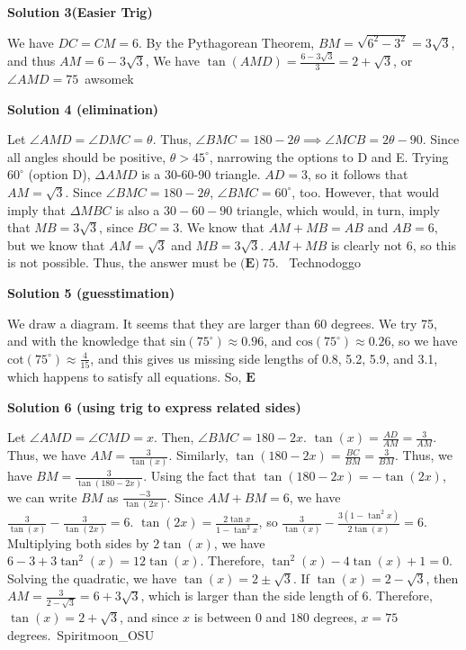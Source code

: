 \begin{enumerate}
\textbf{Solution 3(Easier Trig)}

We have $DC=CM=6$. By the Pythagorean Theorem, $BM=\sqrt{6^2-3^2}=3\sqrt{3}$, and thus $AM=6-3\sqrt{3}$, We have $\tan(AMD)=\frac{6-3\sqrt{3}}{3}=2+\sqrt{3}$, or $\angle AMD=\boxed{75}$~awsomek

 



\textbf{Solution 4 (elimination)}

Let $\angle AMD=\angle DMC=\theta$. Thus, $\angle BMC=180-2\theta\implies\angle MCB=2\theta-90$. Since all angles should be positive, $\theta>45^\circ$, narrowing the options to D and E. Trying $60^\circ$ (option D), $\Delta AMD$ is a 30-60-90 triangle. $AD=3$, so it follows that $AM=\sqrt3$. Since $\angle BMC=180-2\theta$, $\angle BMC=60^\circ$, too. However, that would imply that $\Delta MBC$ is also a $30-60-90$ triangle, which would, in turn, imply that $MB=3\sqrt3$, since $BC=3$. We know that $AM+MB=AB$ and $AB=6,$ but we know that $AM=\sqrt3$ and $MB=3\sqrt3$. $AM+MB$ is clearly not $6$, so this is not possible. Thus, the answer must be $\boxed{\textbf{(E)}~75}$.~ Technodoggo

 



\textbf{Solution 5 (guesstimation)}

We draw a diagram. It seems that they are larger than 60 degrees. We try 75, and with the knowledge that $\text{sin}(75^\circ)\approx 0.96$, and $\text{cos}(75^\circ)\approx 0.26$, so we have $\text{cot}(75^\circ)\approx \frac{4}{15}$, and this gives us missing side lengths of 0.8, 5.2, 5.9, and 3.1, which happens to satisfy all equations. So, $\boxed{\textbf{E}}$




\textbf{Solution 6 (using trig to express related sides)}

Let \(\angle AMD=\angle CMD=x\). Then, \(\angle BMC=180-2x\). \(\tan (x)=\frac{AD}{AM}=\frac{3}{AM}\). Thus, we have \(AM=\frac{3}{\tan (x)}\). Similarly, \(\tan (180-2x)=\frac{BC}{BM}=\frac{3}{BM}\). Thus, we have \(BM=\frac{3}{\tan (180-2x)}\). Using the fact that \(\tan (180-2x)=-\tan (2x)\), we can write \(BM\) as \(\frac{-3}{\tan (2x)}\). Since \(AM+BM=6\), we have \(\frac{3}{\tan (x)}-\frac{3}{\tan (2x)}=6\). \(\tan (2x)=\frac{2\tan x}{1-\tan ^{2}x}\), so \(\frac{3}{\tan (x)}-\frac{3(1-\tan ^{2}x)}{2\tan (x)}=6\). Multiplying both sides by \(2\tan (x)\), we have \(6-3+3\tan ^{2}(x)=12\tan (x)\). Therefore, \(\tan ^{2}(x)-4\tan (x)+1=0\). Solving the quadratic, we have \(\tan (x)=2\pm \sqrt{3}\). If \(\tan (x)=2-\sqrt{3}\), then \(AM=\frac{3}{2-\sqrt{3}}=6+3\sqrt{3}\), which is larger than the side length of \(6\). Therefore, \(\tan (x)=2+\sqrt{3}\), and since \(x\) is between \(0\) and \(180\) degrees, \(x=75\) degrees.~Spiritmoon\_OSU


\end{enumerate}
